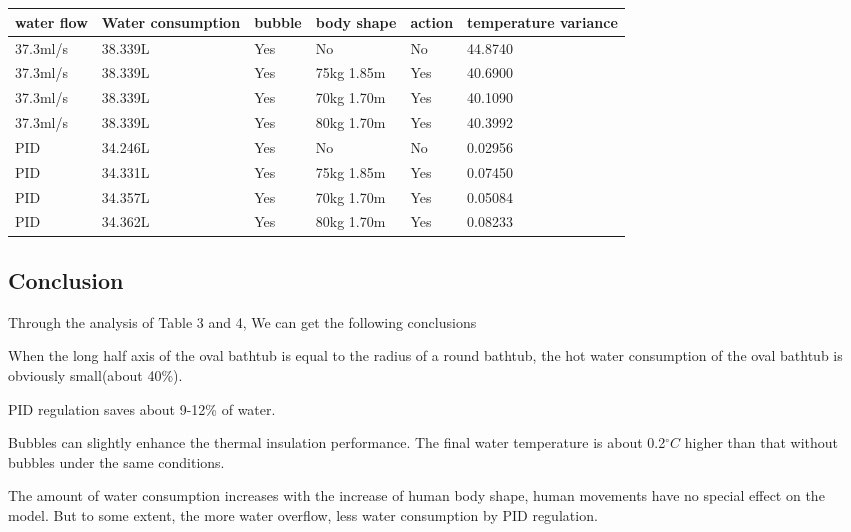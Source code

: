 \documentclass{mcmthesis}
\begin{document}
\begin{table}[H]
	\setlength{\abovecaptionskip}{0pt}
	\setlength{\belowcaptionskip}{0pt}
	\\
	\\
	\begin{tabular}{p{2cm}|p{2cm}|p{1.5cm}|p{3cm}|p{1cm}|p{2cm}}
		\hline
		\rowcolor[gray]{0.9}\bf{water flow}	&\bf{Water consumption} &\bf{bubble}&\bf{body shape}&\bf{action}&\bf{temperature variance} \\
		\hline
		37.3ml/s & 38.339L &Yes &No 		&No  &44.8740\\
		37.3ml/s & 38.339L &Yes &75kg 1.85m &Yes &40.6900\\	
		37.3ml/s & 38.339L &Yes &70kg 1.70m &Yes &40.1090\\
		37.3ml/s & 38.339L &Yes &80kg 1.70m &Yes &40.3992\\
		\hline
		PID & 34.246L &Yes &No &No &0.02956\\
		PID & 34.331L &Yes &75kg 1.85m &Yes &0.07450\\	
		PID & 34.357L &Yes &70kg 1.70m &Yes &0.05084\\
		PID & 34.362L &Yes &80kg 1.70m &Yes &0.08233\\
		\hline
	\end{tabular}
\end{table}

\subsection{Conclusion}
Through the analysis of Table 3 and 4, We can get the following conclusions
\begin{itemize}
\item{When the long half axis of the oval bathtub is equal to the radius of a round bathtub, the hot water consumption of the oval bathtub is obviously small(about 40\%).
\item{PID regulation saves about 9-12\% of water.}
\item{Bubbles can slightly enhance the thermal insulation performance. The final water temperature is about 0.2${^\circ}C$ higher than that without bubbles under the same conditions.
}
\item{The amount of water consumption increases with the increase of human body shape, human movements have no special effect on the model. But to some extent, the more water overflow, less water consumption by PID regulation.
}}
\end{itemize}	
\end{document}
